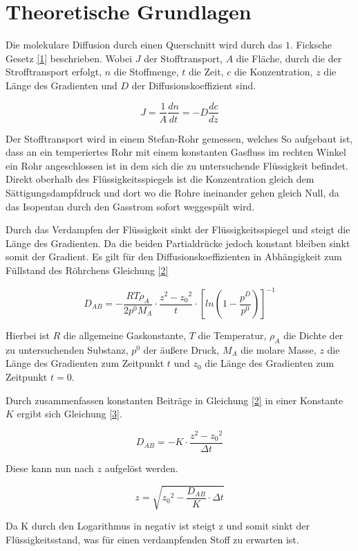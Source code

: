 



\section{Theoretische Grundlagen}

Die molekulare Diffusion durch einen Querschnitt wird durch das $1.$ Ficksche Gesetz \ref{1} beschrieben.  Wobei $J$ der Stofftransport, $A$ die Fläche, durch die der Strofftransport erfolgt, $n$ die Stoffmenge, $t$ die Zeit, $c$ die Konzentration, $z$ die Länge des Gradienten und $D$ der Diffusionskoeffizient sind.

\begin {equation}
J=\frac{1}{A}\frac{dn}{dt}=-D\frac{dc}{dz}
\end {equation}

Der Stofftransport wird in einem Stefan-Rohr gemessen, welches So aufgebaut ist, dass an ein temperiertes Rohr mit einem konstanten Gasfluss im rechten Winkel ein Rohr angeschlossen ist in dem sich die zu untersuchende Flüssigkeit befindet. Direkt oberhalb des Flüssigkeitsspiegels ist die Konzentration gleich dem Sättigungsdampfdruck und dort wo die Rohre ineinander gehen gleich Null, da das Isopentan durch den Gasstrom sofort weggespült wird. 

Durch das Verdampfen der Flüssigkeit sinkt der Flüssigkeitsspiegel und steigt die Länge des Gradienten. Da die beiden Partialdrücke jedoch konstant bleiben sinkt somit der Gradient.  Es gilt für den Diffusionskoeffizienten in Abhängigkeit zum Füllstand des Röhrchens Gleichung \ref{2}

\begin {equation}
D_{AB}=-\frac{RT\rho_A}{2p^0M_A}\cdot\frac{z^2-{z_0}^2}{t} \cdot\left[ln\left(1-\frac{p^D}{p^0}\right)\right]^{-1}
\end{equation}

Hierbei ist $R$ die allgemeine Gaskonstante, $T$ die Temperatur, $\rho_A$ die Dichte der zu untersuchenden Substanz, $p^0$ der äußere Druck, $M_A$ die molare Masse, $z$ die Länge des Gradienten zum Zeitpunkt $t$ und $z_0$ die Länge des Gradienten zum Zeitpunkt $t=0$. 

Durch zusammenfassen konstanten Beiträge in Gleichung \ref{2} in einer Konstante $K$ ergibt sich Gleichung \ref{3}.

\begin {equation}
D_{AB}=-K\cdot\frac{z^2-{z_0}^2}{\Delta t} 
\end{equation}

Diese kann nun nach $z$ aufgelöst werden.

\begin {equation}
z=\sqrt{{z_0}^2-\frac{D_{AB}}{K}\cdot\Delta t} 
\end{equation}

Da K durch den Logarithmus in negativ ist steigt z und somit sinkt der Flüssigkeitsstand, was für einen verdampfenden Stoff zu erwarten ist.






